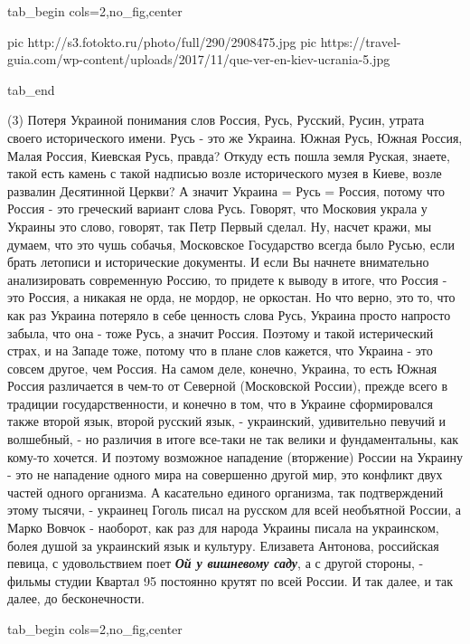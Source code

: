 \ifcmt
  tab_begin cols=2,no_fig,center

     pic http://s3.fotokto.ru/photo/full/290/2908475.jpg
		 pic https://travel-guia.com/wp-content/uploads/2017/11/que-ver-en-kiev-ucrania-5.jpg

  tab_end
\fi

(3) Потеря Украиной понимания слов Россия, Русь, Русский, Русин, утрата своего
исторического имени. Русь - это же Украина. Южная Русь, Южная Россия, Малая
Россия, Киевская Русь, правда?  Откуду есть пошла земля Руская, знаете, такой
есть камень с такой надписью возле исторического музея в Киеве, возле развалин
Десятинной Церкви?  А значит Украина = Русь = Россия, потому что Россия - это
греческий вариант слова Русь. Говорят, что Московия украла у Украины это слово,
говорят, так Петр Первый сделал. Ну, насчет кражи, мы думаем, что это чушь
собачья, Московское Государство всегда было Русью, если брать летописи и
исторические документы. И если Вы начнете внимательно анализировать современную
Россию, то придете к выводу в итоге, что Россия - это Россия, а никакая не
орда, не мордор, не оркостан. Но что верно, это то, что как раз Украина
потеряло в себе ценность слова Русь, Украина просто напросто забыла, что она -
тоже Русь, а значит Россия. Поэтому и такой истерический страх, и на Западе
тоже, потому что в плане слов кажется, что Украина - это совсем другое, чем
Россия. На самом деле, конечно, Украина, то есть Южная Россия различается в
чем-то от Северной (Московской России), прежде всего в традиции
государственности, и конечно в том, что в Украине сформировался также второй
язык, второй русский язык, - украинский, удивительно певучий и волшебный, - но
различия в итоге все-таки не так велики и фундаментальны, как кому-то хочется.
И поэтому возможное нападение (вторжение) России на Украину - это не нападение
одного мира на совершенно другой мир, это конфликт двух частей одного
организма. А касательно единого организма, так подтверждений этому тысячи, -
украинец Гоголь писал на русском для всей необъятной России, а Марко Вовчок -
наоборот, как раз для народа Украины писала на украинском, болея душой за
украинский язык и культуру. Елизавета Антонова, российская певица, с
удовольствием поет \textbf{\emph{Ой у вишневому саду}}, а с другой стороны, - фильмы студии
Квартал 95 постоянно крутят по всей России. И так далее, и так далее, до
бесконечности.

\ifcmt
  tab_begin cols=2,no_fig,center

